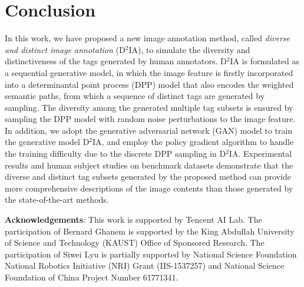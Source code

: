 \documentclass[10pt,twocolumn,letterpaper]{article}
\begin{document}
\section{Conclusion}
\label{sec: conclusion}
\vspace{-0.05in}

In this work, we have proposed a new image annotation method, called {\it diverse and distinct image annotation} (D$^2$IA), to simulate the diversity and distinctiveness of the tags generated by human annotators. 
D$^2$IA is formulated as a sequential generative model, in which the image feature is firstly incorporated into a determinantal point process (DPP) model that also encodes the weighted semantic paths, from which a sequence of distinct tags are generated by sampling. 
The diversity among the generated multiple tag subsets is ensured by sampling the DPP model with random noise perturbations to the image feature.
In addition, we adopt the generative adversarial network (GAN) model to train the generative model D$^2$IA, and employ the policy gradient algorithm to handle the training difficulty due to the discrete DPP sampling in D$^2$IA. 
Experimental results and human subject studies on benchmark datasets demonstrate that the diverse and distinct tag subsets generated by the proposed method can provide more comprehensive descriptions of the image contents than those generated by the state-of-the-art methods.


\vspace{0.05in}
\noindent
\textbf{Acknowledgements}:
This work is supported by Tencent AI Lab. The participation of Bernard Ghanem is supported by the King Abdullah University of Science and Technology (KAUST) Office of Sponsored Research.  
The participation of Siwei Lyu is partially supported by National Science Foundation National Robotics Initiative (NRI) Grant (IIS-1537257) and National Science Foundation of China Project Number 61771341. 


{\small


}
\end{document}
